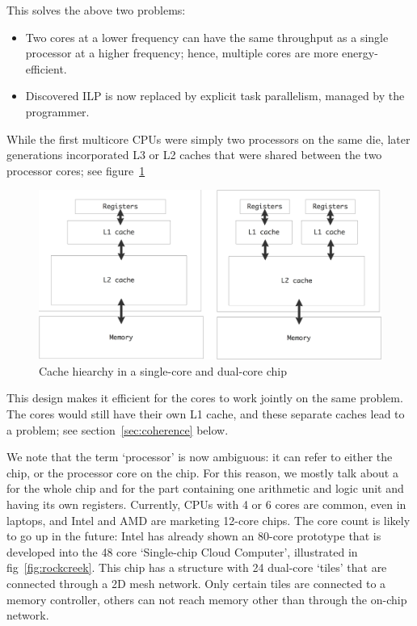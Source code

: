 This solves the above two problems:
\begin{itemize}
\item Two cores at a lower frequency can have the same throughput as a
  single processor at a higher frequency; hence, multiple cores are
  more energy-efficient.
\item Discovered \ac{ILP} is now replaced by explicit task
  parallelism, managed by the programmer.
\end{itemize}

While the first multicore CPUs
were simply two processors on the same die, later generations
incorporated L3 or L2 caches that were shared between the two
processor cores; see figure~\ref{fig:core-caches}
\begin{figure}
  \includegraphics[scale=.18]{graphics-public/cache-hierarchy}
  \caption{Cache hiearchy in a single-core and dual-core chip}
  \label{fig:core-caches}
\end{figure}
This design makes it efficient for the cores to work
jointly on the same problem. 
The cores would still have their own L1 cache, and these separate
caches lead to a  problem; see
section~\ref{sec:coherence} below.

We note that the term `processor' is now ambiguous: it can refer to either the
chip, or the processor core on the chip. For this reason, we mostly
talk about a  for the whole chip and
for the part containing one arithmetic and logic unit and
having its own registers. Currently, CPUs with 4 or 6 cores are
common,
even in laptops, and Intel and AMD are marketing 12-core chips.
The core count is
likely to go up in the future: Intel
has already shown an 80-core prototype that is developed into the 48
core `Single-chip Cloud Computer', illustrated in
fig~\ref{fig:rockcreek}. This chip has a structure with 24 dual-core
`tiles' that are connected through a 2D mesh network. Only certain
tiles are connected to a memory controller, others can not reach
memory other than through the on-chip network.

